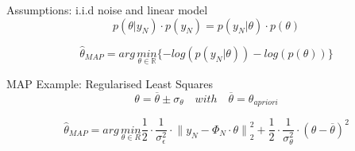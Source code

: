 \begin{tcolorbox}[colback=yellow!5!white,colframe=yellow!75!white,coltitle=black,title=Bayesian Estimation and the Maximum a Posteriori Estimate]
Assumptions: i.i.d noise and linear model
\begin{equation*}
p(\theta |{ y }_{ N })\cdot p({ y }_{ N })=p({ y }_{ N }|\theta )\cdot p(\theta)
\end{equation*}

\begin{equation*}
{ \hat{\theta} }_{ MAP } = arg \, \underset { \theta \in \mathbb{R} }{ min } \{-log(p({ y }_{ N }|\theta))-log(p(\theta))\}
\end{equation*}

MAP Example: Regularised Least Squares
\begin{equation*}
\theta =\overline { \theta  } \pm { \sigma  }_{ \theta  }\quad with \quad \overline { \theta  } = { \theta  }_{ apriori  }
\end{equation*}

\begin{equation*}
{ \hat { \theta  }  }_{ MAP }=arg\, \underset { \theta \in { R } }{ min } \frac { 1 }{ 2 } \cdot \frac { 1 }{ { \sigma  }_{ \epsilon  }^{ 2 } } \cdot { \parallel { y }_{ N }-{ \Phi  }_{ N }\cdot \theta \parallel  }_{ 2 }^{ 2 }+\frac { 1 }{ 2 } \cdot \frac { 1 }{ { \sigma  }_{ \theta  }^{ 2 } } \cdot { (\theta -  \overline{\theta}) }^{ 2 }
\end{equation*}
\end{tcolorbox}


